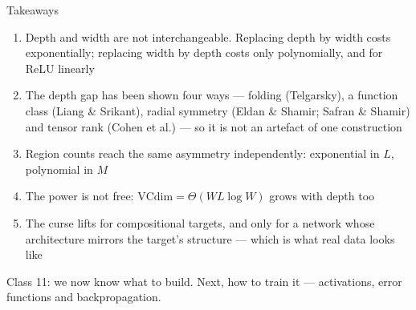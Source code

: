 \documentclass[aspectratio=169, 11pt]{beamer}
\newcommand{\nosrc}{}       %
\begin{document}
\begin{frame}{Takeaways}
  \nosrc
  \vspace{0.1em}
  {\footnotesize
  \begin{enumerate}\setlength{\itemsep}{2pt}
    \item Depth and width are \alert{not interchangeable}. Replacing
          depth by width costs \alert{exponentially}; replacing width
          by depth costs only \alert{polynomially}, and for ReLU
          linearly
    \item The depth gap has been shown four ways --- folding
          (Telgarsky), a function class (Liang \& Srikant), radial
          symmetry (Eldan \& Shamir; Safran \& Shamir) and tensor rank
          (Cohen et al.) --- so it is \alert{not an artefact of one
          construction}
    \item Region counts reach the same asymmetry independently:
          exponential in $L$, polynomial in $M$
    \item The power is not free: $\mathrm{VCdim}=\Theta(WL\log W)$
          grows with depth too
    \item The curse lifts for \alert{compositional} targets, and only
          for a network whose \alert{architecture mirrors} the target's
          structure --- which is what real data looks like
  \end{enumerate}}
  \vspace{0.2em}
  \begin{redhighlight}
    {\footnotesize Class 11: we now know what to build. Next, how to
    \alert{train} it --- activations, error functions and
    backpropagation.}
  \end{redhighlight}
\end{frame}
\end{document}
